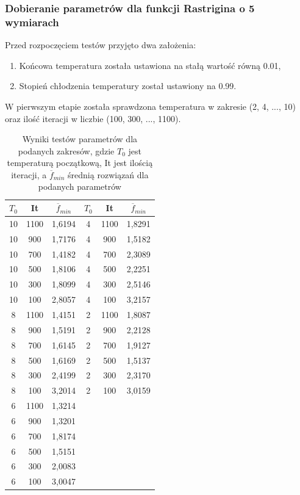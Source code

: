 \documentclass[twoside]{projektInzynierskiMS1}
\newcommand{\si}{ś}
\begin{document}
\subsubsection{Dobieranie parametrów dla funkcji Rastrigina o 5 wymiarach}

Przed rozpoczęciem testów przyjęto dwa założenia:
\begin{enumerate}
	\item Końcowa temperatura została ustawiona na stałą warto\si ć równą 0.01,
	\item Stopień chłodzenia temperatury został ustawiony na 0.99.
\end{enumerate}

W pierwszym etapie została sprawdzona temperatura w zakresie (2, 4, ..., 10) oraz ilo\si ć iteracji w liczbie (100, 300, ..., 1100). \\
\begin{table}[htbp]\centering
\def\sym#1{\ifmmode^{#1}\else\(^{#1}\)\fi}
\caption{Wyniki testów parametrów dla podanych zakresów, gdzie $T_0$ jest temperaturą początkową, It jest ilo\si cią iteracji, a $\overline{f}_{min}$ \si rednią rozwiązań dla podanych parametrów}
\renewcommand\arraystretch{1.333}
\begin{tabular}{|c|c|c||c|c|c|} 
                  \hline
                  \textbf{$T_0$}
                  & \textbf{It}
                  &\textbf{$\overline{f}_{min}$} 
& \textbf{$T_0$}
 & \textbf{It}
 &\textbf{$\overline{f}_{min}$} \\ \hline

10 & 1100 & 1,6194 &4 & 1100 & 1,8291 \\ \hline
10 & 900 & 1,7176 &4 & 900 & 1,5182 \\ \hline
10 & 700 & 1,4182&4 & 700 & 2,3089 \\ \hline
10 & 500 & 1,8106&4 & 500 & 2,2251 \\ \hline
10 & 300 & 1,8099 &4 & 300 & 2,5146 \\ \hline 
10 & 100 & 2,8057&4 & 100 & 3,2157 \\ \Xhline{3\arrayrulewidth}

8 & 1100 & 1,4151 &2 & 1100 & 1,8087 \\ \hline 
8 & 900 & 1,5191 &2 & 900 & 2,2128 \\ \hline 
8 & 700 & 1,6145 &2 & 700 & 1,9127 \\ \hline
8 & 500 & 1,6169 &2 & 500 & 1,5137 \\ \hline 
8 & 300 & 2,4199 &2 & 300 & 2,3170 \\ \hline 
8 & 100 & 3,2014 &2 & 100 & 3,0159 \\ \Xhline{3\arrayrulewidth}

6 & 1100 & 1,3214 \\ \hline 
6 & 900 & 1,3201 \\ \hline 
6 & 700 & 1,8174 \\ \hline 
6 & 500 & 1,5151 \\ \hline 
6 & 300 & 2,0083 \\ \hline 
6 & 100 & 3,0047 \\ \hline 
\end{tabular}
\end{table}
\end{document}
